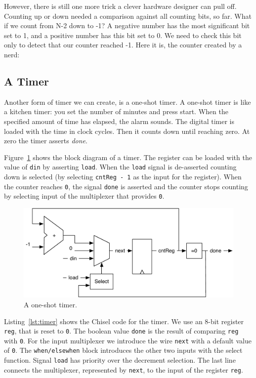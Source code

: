 \documentclass[%
    10pt,
    headinclude, footexclude,
    openright, %
    notitlepage,
    cleardoubleempty,
    headsepline,
    pointlessnumbers,
    bibtotoc, idxtotoc,
    ]{scrbook}
\newcommand{\code}[1]{{\small{\texttt{#1}}}}
\newcommand{\scale}{0.7}
\begin{document}
However, there is still one more trick a clever hardware designer can pull off.
Counting up or down needed a comparison against all counting bits, so far.
What if we count from N-2 down to -1? A negative number has the most significant bit
set to 1, and a positive number has this bit set to 0. We need to check this bit only to detect
that our counter reached -1. Here it is, the counter created by a nerd:



\subsection{A Timer}

Another form of timer we can create, is a one-shot timer. A one-shot timer is like a
kitchen timer: you set the number of minutes and press start. When the specified amount
of time has elapsed, the alarm sounds.
The digital timer is loaded with the time in clock cycles.
Then it counts down until reaching zero. At zero the timer asserts \emph{done}.

Figure~\ref{fig:timer} shows the block diagram of a timer. The register can be loaded with
the value of \code{din} by asserting \code{load}. When the \code{load} signal is de-asserted
counting down is selected (by selecting \code{cntReg - 1} as the input for the register).
When the counter reaches \code{0}, the signal \code{done} is asserted and the counter stops
counting by selecting input of the multiplexer that provides \code{0}.

\begin{figure}
  \centering
  \includegraphics[scale=\scale]{figures/timer}
  \caption{A one-shot timer.}
  \label{fig:timer}
\end{figure}

Listing~\ref{lst:timer} shows the Chisel code for the timer. We use an 8-bit register \code{reg},
that is reset to \code{0}. The boolean value \code{done} is the result of comparing \code{reg}
with \code{0}. For the input multiplexer we introduce the wire \code{next} with a default
value of \code{0}. The \code{when/elsewhen} block introduces the other two inputs with
the select function. Signal \code{load} has priority over the decrement selection.
The last line connects the multiplexer, represented by \code{next}, to the input of the
register \code{reg}.
\end{document}
